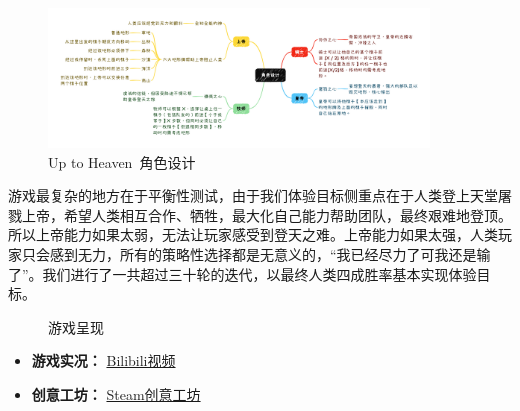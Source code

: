 \begin{figure}[H]
    \centering
    \includegraphics[width=0.9\textwidth]{Images/Up to Heaven/design.png}
    \caption{Up to Heaven\ 角色设计}
    \label{fig:UTH_Design}
\end{figure}

游戏最复杂的地方在于平衡性测试，由于我们体验目标侧重点在于人类登上天堂屠戮上帝，希望人类相互合作、牺牲，最大化自己能力帮助团队，最终艰难地登顶。所以上帝能力如果太弱，无法让玩家感受到登天之难。上帝能力如果太强，人类玩家只会感到无力，所有的策略性选择都是无意义的，“我已经尽力了可我还是输了”。我们进行了一共超过三十轮的迭代，以最终人类四成胜率基本实现体验目标。

\begin{figure}[H]
\centering  %
\caption{游戏呈现}
\end{figure}




\begin{itemize}
    \item \textbf{游戏实况：}  \href{https://www.bilibili.com/video/BV1jL411179M/?vd_source=ead0ac501dfae814e19fd7d9f376d92d}{Bilibili视频}
    \item \textbf{创意工坊：}  \href{https://steamcommunity.com/sharedfiles/filedetails/?id=2847103396}{Steam创意工坊} 
\end{itemize}